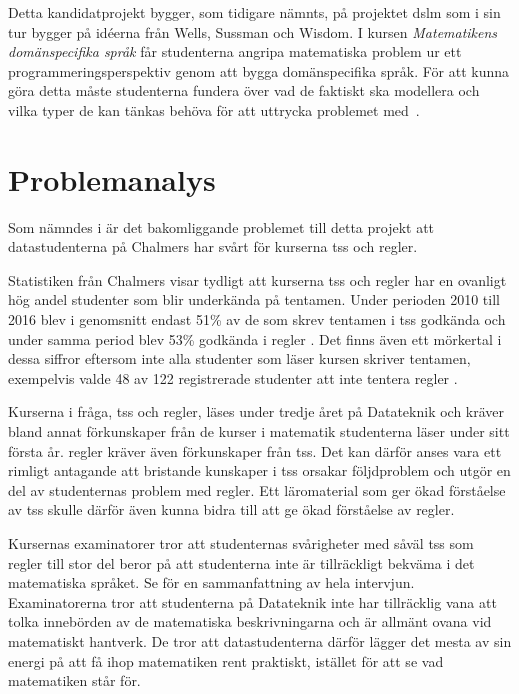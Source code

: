 \documentclass[12pt,a4paper,twoside,openright]{article}
\begin{document}
Detta kandidatprojekt bygger, som tidigare nämnts, på projektet \gls{dslm} som
i sin tur bygger på idéerna från Wells, Sussman och Wisdom. I kursen
\textit{Matematikens domänspecifika språk} får studenterna
angripa matematiska problem ur ett programmeringsperspektiv
genom att bygga domänspecifika språk. För att kunna göra detta måste
studenterna fundera över vad de faktiskt ska modellera och vilka typer
de kan tänkas behöva för att uttrycka problemet
med~\cite{kursplan:dslsofmath}.

\newpage

\section{Problemanalys}
Som nämndes i  är det bakomliggande
problemet till detta projekt att datastudenterna
på Chalmers har svårt för kurserna \gls{tss} och \gls{regler}.

Statistiken från Chalmers visar tydligt att kurserna \gls{tss} och
\gls{regler} har en ovanligt hög andel studenter som blir underkända
på tentamen. Under perioden 2010 till 2016 blev i genomsnitt endast
51\% av de som skrev tentamen i \gls{tss} godkända och under samma
period blev 53\% godkända i \gls{regler} \cite{tentastatistik}.
Det finns även ett mörkertal i dessa siffror eftersom inte alla
studenter som läser kursen skriver tentamen, exempelvis valde 48 av
122 registrerade studenter att inte tentera \gls{regler}
\cite{kursinformation:ere102:14-15}.

Kurserna i fråga, \gls{tss} och \gls{regler}, läses under tredje året
på Datateknik och kräver bland annat förkunskaper från de kurser i
matematik studenterna läser under sitt första år. \gls{regler} kräver
även förkunskaper från \gls{tss}. Det kan därför anses vara ett
rimligt antagande att bristande kunskaper i \gls{tss} orsakar
följdproblem och utgör en del av studenternas problem med
\gls{regler}. Ett läromaterial som ger ökad förståelse av \gls{tss}
skulle därför även kunna bidra till att ge ökad förståelse av \gls{regler}.

Kursernas examinatorer tror att studenternas svårigheter med
såväl \gls{tss} som \gls{regler}
till stor del beror på att studenterna inte är tillräckligt bekväma i
det matematiska språket. Se  för en
sammanfattning av hela intervjun. Examinatorerna tror att studenterna
på Datateknik inte har tillräcklig vana att tolka innebörden av de
matematiska beskrivningarna och är allmänt ovana vid matematiskt
hantverk. De tror att datastudenterna därför lägger det mesta av sin
energi på att få ihop matematiken rent praktiskt, istället för att se
vad matematiken står för.
\end{document}
